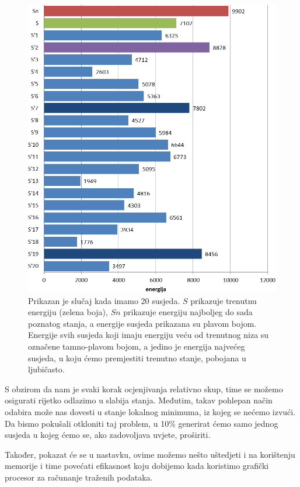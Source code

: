 \documentclass[times, utf8, zavrsni]{fer}
\begin{document}
\begin{figure}
\centering
\includegraphics[scale=0.5]{res/energije_susjeda.png}
\caption[Korištenje više susjeda u algoritmu simuliranog kaljenja]{
Prikazan je slučaj kada imamo 20 susjeda. $S$ prikazuje trenutnu energiju
(zelena boja), $Sn$ prikazuje energiju najboljeg do sada poznatog stanja,
a energije susjeda prikazana su plavom bojom. Energije svih susjeda koji
imaju energiju veću od trenutnog niza su označene tamno-plavom bojom,
a jedino je energija najvećeg susjeda, u koju ćemo premjestiti trenutno
stanje, pobojana u ljubičasto.}
\label{figure:susjedi}
\end{figure}

S obzirom da nam je svaki korak ocjenjivanja relativno skup, time se možemo
osigurati rijetko odlazimo u slabija stanja. Međutim, takav pohlepan
način odabira može nas dovesti u stanje lokalnog minimuma, iz kojeg se nećemo
izvući. Da bismo pokušali otkloniti taj problem, u 10\% generirat ćemo samo jednog
susjeda u kojeg ćemo se, ako zadovoljava uvjete, proširiti. 

Također, pokazat će se u nastavku, ovime možemo nešto uštedjeti i na korištenju
memorije i time povećati efikasnost koju dobijemo kada koristimo grafički
procesor za računanje traženih podataka. 
\end{document}
